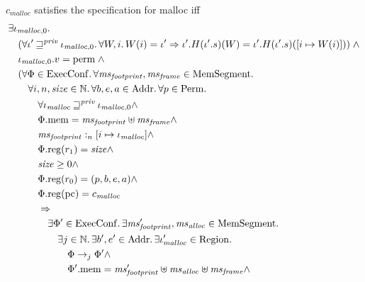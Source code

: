 \documentclass[a4paper]{article}
\newcommand{\var}[1]{\mathit{#1}}
\newcommand{\hs}{\var{ms}}
\newcommand{\ms}{\hs}
\newcommand{\pcreg}{\mathrm{pc}}
\newcommand{\heap}{\var{mem}}
\newcommand{\plainproj}[1]{\mathrm{#1}}
\newcommand{\memheap}[1][\Phi]{#1.\plainproj{mem}}
\newcommand{\memreg}[1][\Phi]{#1.\plainproj{reg}}
\newcommand{\futurestr}{\mathbin{\sqsupseteq}^{\var{priv}}}
\newcommand{\heapSat}[3][\heap]{#1 :_{#2} #3}
\newcommand{\codelabel}[1]{\mathit{#1}}
\newcommand{\malloc}{\codelabel{malloc}}
\newcommand{\plaindom}[1]{\mathrm{#1}}
\newcommand{\Addrs}{\plaindom{Addr}}
\newcommand{\ExecConfs}{\plaindom{ExecConf}}
\newcommand{\HeapSegments}{\plaindom{MemSegment}}
\newcommand{\nats}{\mathbb{N}}
\newcommand{\Perms}{\plaindom{Perm}}
\newcommand{\Regions}{\plaindom{Region}}
\newcommand{\plainview}[1]{\mathrm{#1}}
\newcommand{\perma}{\plainview{perm}}
\newcommand{\step}[1][]{\rightarrow_{#1}}
\begin{document}
              \begin{specification}[Malloc v.2]
                $c_\malloc$ satisfies the specification for malloc iff
                \[  
                  \begin{aligned}
                    &\exists \iota_{\malloc,0} \ldotp \\
                    &\quad (\forall \iota' \futurestr \iota_{\malloc,0} \ldotp \forall W,i \ldotp W(i)=\iota' \Rightarrow \iota'.H (\iota'.s) (W) = \iota'.H (\iota'.s) ([i \mapsto W(i)]) ) \; \land \\
                    &\quad \iota_{\malloc,0}.v = \perma \; \land \\
                    &\quad (\forall \Phi \in \ExecConfs \ldotp \forall \ms_{\var{footprint}}, \hsframe \in \HeapSegments \ldotp \\
                    &\qquad \forall i, n, \size \in \nats \ldotp \forall b,e,a \in \Addrs\ldotp\forall p \in \Perms \ldotp \\
                    &\qquad \quad \forall \iota_\malloc \futurestr \iota_{\malloc,0} \land \\
                    &\qquad \quad \memheap = \ms_{\var{footprint}} \uplus \hsframe \land\\
                    &\qquad \quad \heapSat[\ms_{\var{footprint}}]{n}{[i \mapsto \iota_\malloc]} \land \\
                    &\qquad \quad \memreg(r_1) = \size \land \\
                    &\qquad \quad \size \geq 0 \land \\
                    &\qquad \quad \memreg(r_0) = (p,b,e,a) \land \\
                    &\qquad \quad \memreg(\pcreg) = c_\malloc \\ %
                    &\qquad \quad \Rightarrow \\
                    &\qquad \qquad\exists \Phi' \in \ExecConfs \ldotp \exists \ms_{\var{footprint}}', \ms_{\var{alloc}} \in \HeapSegments\ldotp\\
                    &\qquad \qquad \quad \exists j \in \nats \ldotp \exists b',e'\in \Addrs \ldotp \exists \iota_\malloc' \in \Regions \ldotp \\
                    &\qquad \qquad \qquad \Phi \step[j] \Phi' \land \\
                    &\qquad \qquad \qquad \memheap[\Phi']=\ms_{\var{footprint}}' \uplus \hs_{\var{alloc}} \uplus \hsframe \land\\

\end{aligned}\]
\end{specification}
\end{document}
